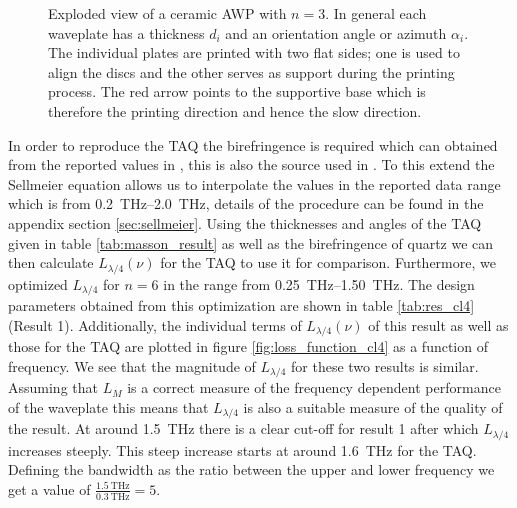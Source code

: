 \begin{figure}[ht]
    \centering
    
    \caption{Exploded view of a ceramic AWP with $n=3$. In general each waveplate has a thickness $d_i$ and an orientation angle or azimuth $\alpha_i$. The individual plates are printed with two flat sides; one is used to align the discs and the other serves as support during the printing process. The red arrow points to the supportive base which is therefore the printing direction and hence the slow direction.}
    \label{fig:ceramic_stack}
\end{figure}

In order to reproduce the TAQ the birefringence is required which can obtained from the reported values in \cite{DGrischkowsky1990}, this is also the source used in \cite{Masson2006}. To this extend the Sellmeier equation allows us to interpolate the values in the reported data range which is from \SIrange{0.2}{2.0}{\tera \hertz}, details of the procedure can be found in the appendix section \ref{sec:sellmeier}. Using the thicknesses and angles of the TAQ given in table \ref{tab:masson_result} as well as the birefringence of quartz we can then calculate $L_{\lambda/4}(\nu)$ for the TAQ to use it for comparison. Furthermore, we optimized $L_{\lambda/4}$ for $n=6$ in the range from \SIrange{0.25}{1.50}{\tera \hertz}. The design parameters obtained from this optimization are shown in table \ref{tab:res_cl4} (Result 1). Additionally, the individual terms of $L_{\lambda/4}(\nu)$ of this result as well as those for the TAQ are plotted in figure \ref{fig:loss_function_cl4} as a function of frequency. We see that the magnitude of $L_{\lambda/4}$ for these two results is similar. Assuming that $L_{M}$ is a correct measure of the frequency dependent performance of the waveplate this means that $L_{\lambda/4}$ is also a suitable measure of the quality of the result. At around \SI{1.5}{\tera \hertz} there is a clear cut-off for result 1 after which $L_{\lambda/4}$ increases steeply. This steep increase starts at around \SI{1.6}{\tera \hertz} for the TAQ. Defining the bandwidth as the ratio between the upper and lower frequency we get a value of  $\frac{\SI{1.5}{\tera \hertz}}{\SI{0.3}{\tera \hertz}}=5$. 

\begin{table}[ht]
    \centering
    
    \caption{Design parameters for result 1 and 2. Both results are obtained through the optimization of $L_{\lambda/4}$ for $n=6$. In the case of result 1 the frequency range for the optimization was limited to \SIrange[range-phrase=-, range-units=single]{0.25}{1.50}{\tera \hertz} while for result 2 the range was set to \SIrange[range-phrase=-, range-units=single]{0.50}{2.25}{\tera \hertz}.}
    \label{tab:res_cl4}
\end{table}


